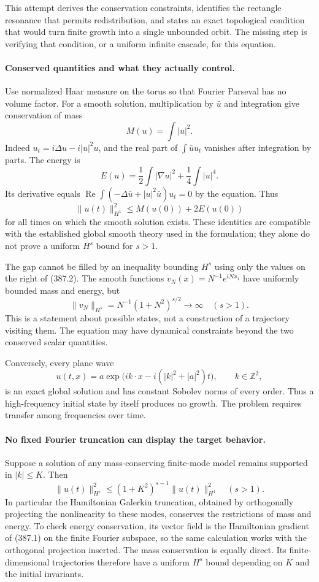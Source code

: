 \documentclass[11pt]{article}
\begin{document}
This attempt derives the conservation constraints, identifies the
rectangle resonance that permits redistribution, and states an exact
topological condition that would turn finite growth into a single
unbounded orbit. The missing step is verifying that condition, or a
uniform infinite cascade, for this equation.

\paragraph{Conserved quantities and what they actually control.}
Use normalized Haar measure on the torus so that Fourier Parseval
has no volume factor. For a smooth solution, multiplication by
$\bar u$ and integration give conservation of mass
\[
 M(u)=\int|u|^2.
\]
Indeed $u_t=i\Delta u-i|u|^2u$, and the real part of
$\int\bar u u_t$ vanishes after integration by parts. The energy is
\[
 E(u)=\frac12\int|\nabla u|^2+\frac14\int|u|^4.
 \tag{387.1}
\]
Its derivative equals
$\operatorname{Re}\int(-\Delta\bar u+|u|^2\bar u)u_t=0$
by the equation. Thus
\[
 \|u(t)\|_{H^1}^2\leq M(u(0))+2E(u(0))
 \tag{387.2}
\]
for all times on which the smooth solution exists. These identities
are compatible with the established global smooth theory used in
the formulation; they alone do not prove a uniform $H^s$ bound
for $s>1$.

The gap cannot be filled by an inequality bounding $H^s$ using only
the values on the right of (387.2). The smooth functions
$v_N(x)=N^{-1}e^{iNx_1}$ have uniformly bounded mass and energy,
but
\[
 \|v_N\|_{H^s}=N^{-1}(1+N^2)^{s/2}\longrightarrow\infty
 \quad(s>1).
 \tag{387.3}
\]
This is a statement about possible states, not a construction of
a trajectory visiting them. The equation may have dynamical
constraints beyond the two conserved scalar quantities.

Conversely, every plane wave
\[
 u(t,x)=a\exp\bigl(i k\cdot x-i(|k|^2+|a|^2)t\bigr),
 \qquad k\in\mathbb Z^2,
 \tag{387.4}
\]
is an exact global solution and has constant Sobolev norms of every
order. Thus a high-frequency initial state by itself produces no
growth. The problem requires transfer among frequencies over time.

\paragraph{No fixed Fourier truncation can display the target behavior.}
Suppose a solution of any mass-conserving finite-mode model remains
supported in $|k|\leq K$. Then
\[
 \|u(t)\|_{H^s}^2
 \leq(1+K^2)^{s-1}\|u(t)\|_{H^1}^2
 \quad(s>1).
 \tag{387.5}
\]
In particular the Hamiltonian Galerkin truncation, obtained by
orthogonally projecting the nonlinearity to these modes, conserves
the restrictions of mass and energy. To check energy conservation,
its vector field is the Hamiltonian gradient of (387.1) on the
finite Fourier subspace, so the same calculation works with the
orthogonal projection inserted. The mass conservation is equally
direct. Its finite-dimensional trajectories therefore have a uniform
$H^s$ bound depending on $K$ and the initial invariants.
\end{document}
